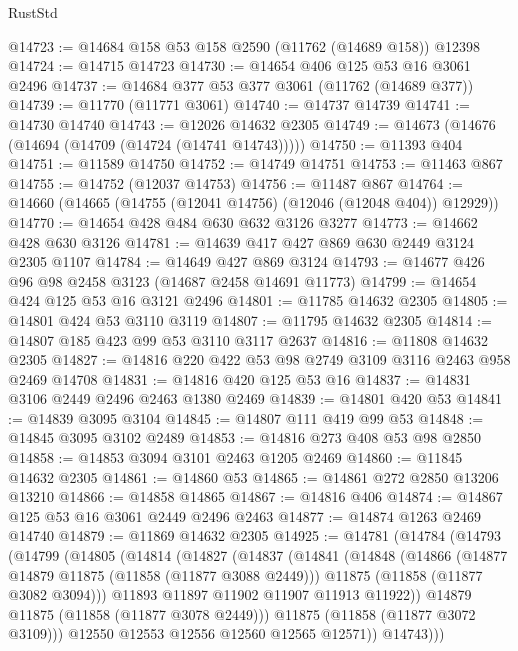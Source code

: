 \begin{lexlean}{RustStd}
\begin{coremodule}
@14723 := @14684 @158 @53 @158 @2590 (@11762 (@14689 @158)) @12398
@14724 := @14715 @14723
@14730 := @14654 @406 @125 @53 @16 @3061 @2496
@14737 := @14684 @377 @53 @377 @3061 (@11762 (@14689 @377))
@14739 := @11770 (@11771 @3061)
@14740 := @14737 @14739
@14741 := @14730 @14740
@14743 := @12026 @14632 @2305
@14749 := @14673 (@14676 (@14694 (@14709 (@14724 (@14741 @14743)))))
@14750 := @11393 @404
@14751 := @11589 @14750
@14752 := @14749 @14751
@14753 := @11463 @867
@14755 := @14752 (@12037 @14753)
@14756 := @11487 @867
@14764 := @14660 (@14665 (@14755 (@12041 @14756) (@12046 (@12048 @404)) @12929))
@14770 := @14654 @428 @484 @630 @632 @3126 @3277
@14773 := @14662 @428 @630 @3126
@14781 := @14639 @417 @427 @869 @630 @2449 @3124 @2305 @1107
@14784 := @14649 @427 @869 @3124
@14793 := @14677 @426 @96 @98 @2458 @3123 (@14687 @2458 @14691 @11773)
@14799 := @14654 @424 @125 @53 @16 @3121 @2496
@14801 := @11785 @14632 @2305
@14805 := @14801 @424 @53 @3110 @3119
@14807 := @11795 @14632 @2305
@14814 := @14807 @185 @423 @99 @53 @3110 @3117 @2637
@14816 := @11808 @14632 @2305
@14827 := @14816 @220 @422 @53 @98 @2749 @3109 @3116 @2463 @958 @2469 @14708
@14831 := @14816 @420 @125 @53 @16
@14837 := @14831 @3106 @2449 @2496 @2463 @1380 @2469
@14839 := @14801 @420 @53
@14841 := @14839 @3095 @3104
@14845 := @14807 @111 @419 @99 @53
@14848 := @14845 @3095 @3102 @2489
@14853 := @14816 @273 @408 @53 @98 @2850
@14858 := @14853 @3094 @3101 @2463 @1205 @2469
@14860 := @11845 @14632 @2305
@14861 := @14860 @53
@14865 := @14861 @272 @2850 @13206 @13210
@14866 := @14858 @14865
@14867 := @14816 @406
@14874 := @14867 @125 @53 @16 @3061 @2449 @2496 @2463
@14877 := @14874 @1263 @2469 @14740
@14879 := @11869 @14632 @2305
@14925 := @14781
    (@14784
      (@14793
        (@14799
          (@14805
            (@14814
              (@14827
                (@14837
                  (@14841
                    (@14848
                      (@14866
                        (@14877 @14879 @11875 (@11858 (@11877 @3088 @2449)))
                        @11875
                        (@11858 (@11877 @3082 @3094)))
                      @11893
                      @11897
                      @11902
                      @11907
                      @11913
                      @11922))
                  @14879
                  @11875
                  (@11858 (@11877 @3078 @2449)))
                @11875
                (@11858 (@11877 @3072 @3109)))
              @12550
              @12553
              @12556
              @12560
              @12565
              @12571))
          @14743)))

\end{coremodule}
\end{lexlean}
